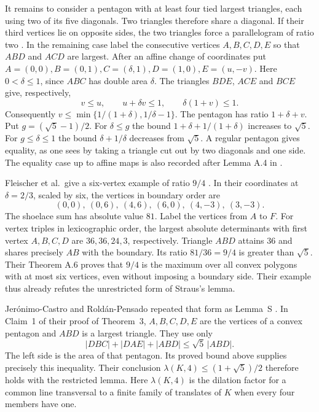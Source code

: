 \documentclass[11pt]{article}
\newcommand{\area}[1]{\lvert #1\rvert}
\begin{document}
It remains to consider a pentagon with at least four tied largest
triangles, each using two of its five diagonals. Two triangles
therefore share a diagonal. If their third vertices lie on opposite
sides, the two triangles force a parallelogram of ratio two
\cite[Lemma A.3]{FMRWY}. In the remaining case label the consecutive
vertices $A,B,C,D,E$ so that $ABD$ and $ACD$ are largest. After an
affine change of coordinates put
$A=(0,0),B=(0,1),C=(\delta,1),D=(1,0),E=(u,-v)$.
Here $0<\delta\le1$, since $ABC$ has double area $\delta$.
The triangles $BDE$, $ACE$ and $BCE$ give, respectively,
\[
  v\le u,\qquad u+\delta v\le1,\qquad \delta(1+v)\le1 .
\]
Consequently $v\le\min\{1/(1+\delta),1/\delta-1\}$. The pentagon
has ratio $1+\delta+v$. Put $g=(\sqrt5-1)/2$. For $\delta\le g$
the bound $1+\delta+1/(1+\delta)$ increases to $\sqrt5$.
For $g\le\delta\le1$ the bound $\delta+1/\delta$ decreases from
$\sqrt5$. A regular pentagon gives equality, as one sees by taking a
triangle cut out by two diagonals and one side. The equality case
up to affine maps is also recorded after Lemma A.4 in \cite{FMRWY}.

Fleischer et al.\ give a six-vertex example of ratio $9/4$
\cite[Lemma A.4, Case 2 and Fig.~13]{FMRWY}. In their coordinates
at $\delta=2/3$, scaled by six, the vertices in boundary order are
\[
 (0,0),\ (0,6),\ (4,6),\ (6,0),\ (4,-3),\ (3,-3).
\]
The shoelace sum has absolute value $81$. Label the vertices from $A$
to $F$. For vertex triples in lexicographic order, the largest absolute
determinants with first vertex $A,B,C,D$ are $36,36,24,3$,
respectively. Triangle $ABD$ attains $36$ and shares precisely $AB$
with the boundary. Its ratio $81/36=9/4$ is greater than $\sqrt5$.
Their Theorem A.6 proves that $9/4$ is the maximum over all convex
polygons with at most six vertices, even without imposing a boundary
side. Their example thus already refutes the unrestricted form of
Straus's lemma.

Jer\'onimo-Castro and Rold\'an-Pensado repeated that form as Lemma~S
\cite[p.~337]{JCRP}. In Claim~1 of their proof of Theorem~3,
$A,B,C,D,E$ are the vertices of a convex pentagon and $ABD$ is a
largest triangle. They use only
\[
 \area{DBC}+\area{DAE}+\area{ABD}\le\sqrt5\,\area{ABD}.
\]
The left side is the area of that pentagon. Its proved bound above
supplies precisely this inequality. Their conclusion
$\lambda(K,4)\le(1+\sqrt5)/2$ therefore holds with the restricted
lemma. Here $\lambda(K,4)$ is the dilation factor for a common line
transversal to a finite family of translates of $K$ when every four
members have one.
\end{document}
